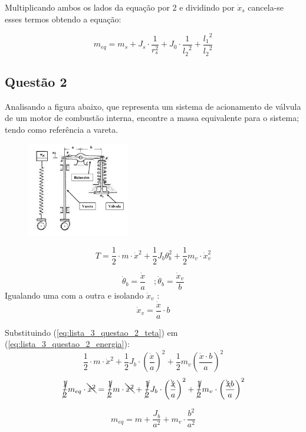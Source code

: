 Multiplicando ambos os lados da equação por 2 e dividindo por $\dot{x}_s$ cancela-se esses termos obtendo a equação:

 \[
     m_{eq}= m_s + J_s\cdot \frac{1}{r_s^2}+ J_0\cdot \frac{1}{{l_2}^2} + \frac{{l_1}^{2}}{{l_2}^{2}}
\]


\subsection{Questão 2}
Analisando a figura abaixo, que representa um sistema de acionamento de válvula de um motor de
combustão interna, encontre a massa equivalente para o sistema; tendo como referência a vareta.
\begin{figure}[ht]
    \centering
    \includegraphics[width=0.4\textwidth]{imagens/lista_3_questao_2.png}
    \label{fig:questao2}
\end{figure}
\resol

\begin{equation}\label{eq:lista_3_questao_2_energia}
    T = \frac{1}{2}\cdot m\cdot \dot{x}^2 + \frac{1}{2} J_b \theta_b^2 + \frac{1}{2} m_v\cdot \dot{x}_v^2
\end{equation}

\[
    \dot{\theta}_b = \frac{\dot x}{a}\quad ; \dot\theta_b= \frac{\dot x_v}{b}
\]
Igualando uma com a outra e isolando $\dot x_v$ :
\begin{equation}\label{eq:lista_3_questao_2_teta}
 \dot x_v=\frac{\dot x}{a}\cdot b
\end{equation}

Substituindo (\ref{eq:lista_3_questao_2_teta}) em (\ref{eq:lista_3_questao_2_energia}):
\[
    \frac{1}{2}\cdot m \cdot \dot x^2 + \frac{1}{2}J_b\cdot \left( \frac{\dot x}{a} \right)^2 + \frac{1}{2}m_v \left(\frac{\dot x \cdot b}{a}  \right)^2
\]
\[
    \cancel{\frac{1}{2}}m_{eq}\cdot\bcancel{\dot x^2} = \cancel{\frac{1}{2}}m\cdot\bcancel{\dot x^2} + \cancel{\frac{1}{2}}J_b\cdot \left( \frac{\bcancel{\dot x}}{a} \right)^2 + \cancel{\frac{1}{2}}m_v \cdot \left( \frac{\bcancel{\dot x}b}{a} \right)^2
\]

\[
m_{eq}= m + \frac{J_b}{a^2} + m_v\cdot \frac{b^2}{a^2}
\]
